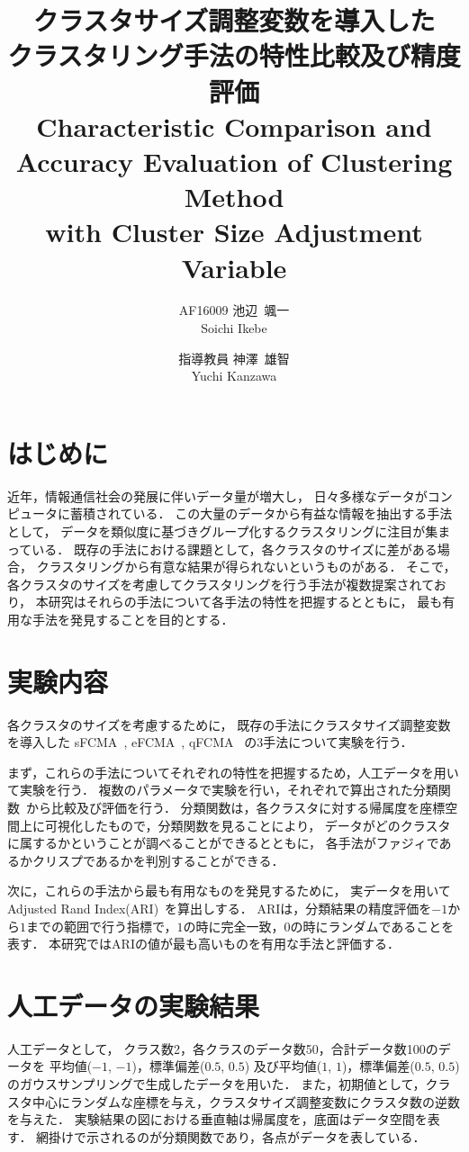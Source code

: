 \documentclass[twocolumn, a4paper]{icethesisabst}
\title{{\bf クラスタサイズ調整変数を導入した \\ クラスタリング手法の特性比較及び精度評価}
  {\normalsize \\ Characteristic Comparison and Accuracy Evaluation of Clustering Method \\ with Cluster Size Adjustment Variable}}
\author{
    AF16009 池辺~颯一 \\ Soichi Ikebe \and
    指導教員 神澤~雄智 \\ Yuchi Kanzawa
  }
\begin{document}
\maketitle


\section{はじめに}
近年，情報通信社会の発展に伴いデータ量が増大し，
日々多様なデータがコンピュータに蓄積されている．
この大量のデータから有益な情報を抽出する手法として，
データを類似度に基づきグループ化するクラスタリングに注目が集まっている．
既存の手法における課題として，各クラスタのサイズに差がある場合，
クラスタリングから有意な結果が得られないというものがある．
そこで，各クラスタのサイズを考慮してクラスタリングを行う手法が複数提案されており，
本研究はそれらの手法について各手法の特性を把握するとともに，
最も有用な手法を発見することを目的とする．


\section{実験内容}
各クラスタのサイズを考慮するために，
既存の手法にクラスタサイズ調整変数を導入した
sFCMA~\cite{sFCMA}, eFCMA~\cite{eFCMA}, qFCMA~\cite{qFCMA}
の3手法について実験を行う．

まず，これらの手法についてそれぞれの特性を把握するため，人工データを用いて実験を行う．
複数のパラメータで実験を行い，それぞれで算出された分類関数~\cite{cFunc}から比較及び評価を行う．
分類関数は，各クラスタに対する帰属度を座標空間上に可視化したもので，分類関数を見ることにより，
データがどのクラスタに属するかということが調べることができるとともに，
各手法がファジィであるかクリスプであるかを判別することができる．

次に，これらの手法から最も有用なものを発見するために，
実データを用いてAdjusted Rand Index(ARI)~\cite{ARI}を算出しする．
ARIは，分類結果の精度評価を$-1$から$1$までの範囲で行う指標で，$1$の時に完全一致，$0$の時にランダムであることを表す．
本研究ではARIの値が最も高いものを有用な手法と評価する．


\section{人工データの実験結果}
人工データとして，
クラス数2，各クラスのデータ数50，合計データ数100のデータを
平均値($-1$, $-1$)，標準偏差($0.5$, $0.5$)
及び平均値($1$, $1$)，標準偏差($0.5$, $0.5$)
のガウスサンプリングで生成したデータを用いた．
また，初期値として，クラスタ中心にランダムな座標を与え，クラスタサイズ調整変数にクラスタ数の逆数を与えた．
実験結果の図における垂直軸は帰属度を，底面はデータ空間を表す．
網掛けで示されるのが分類関数であり，各点がデータを表している．
\end{document}
